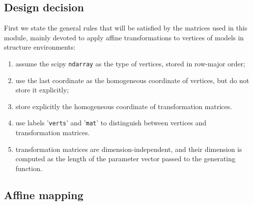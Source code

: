\documentclass[11pt,oneside]{article}	%
\begin{document}
\subsection{Design decision}
First we state the general rules that will be satisfied by the matrices used in this module, mainly devoted to apply affine transformations to vertices of models in structure environments:
\begin{enumerate}
\item assume the scipy \texttt{ndarray} as the type of vertices, stored in row-major order;
\item use the last coordinate as the homogeneous coordinate of vertices, but do not store it explicitly;
\item store explicitly the homogeneous coordinate of transformation matrices.
\item use labels '\texttt{verts}' and '\texttt{mat}' to distinguish between vertices and transformation matrices.
\item transformation matrices are dimension-independent, and their dimension is computed as the length of the parameter vector passed to the generating function.
\end{enumerate}


\subsection{Affine mapping}
\end{document}
